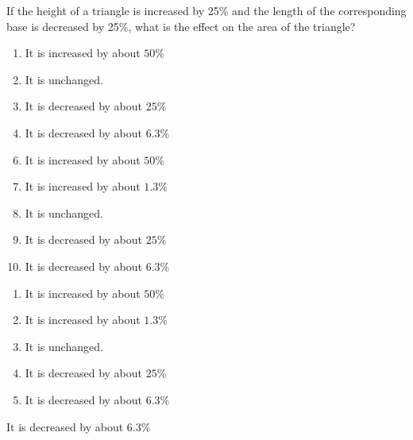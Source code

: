 If the height of a triangle is increased by 25\% and the length of
the corresponding base is decreased by 25\%, what is the effect on
the area of the triangle?


\ifsat
	\begin{enumerate}[label=\Alph*)]
		\item  It is increased by about $50\%$
		\item  It is unchanged.
		\item  It is decreased by about $25\%$
		\item  It is decreased by about $6.3\%$%
	\end{enumerate}
\else
\fi

\ifacteven
	\begin{enumerate}[label=\textbf{\Alph*.},itemsep=\fill,align=left]
		\setcounter{enumii}{5}
		\item  It is increased by about $50\%$
		\item  It is increased by about $1.3\%$
		\item  It is unchanged.
		\addtocounter{enumii}{1}
		\item  It is decreased by about $25\%$
		\item  It is decreased by about $6.3\%$%
	\end{enumerate}
\else
\fi

\ifactodd
	\begin{enumerate}[label=\textbf{\Alph*.},itemsep=\fill,align=left]
		\item  It is increased by about $50\%$
		\item  It is increased by about $1.3\%$
		\item  It is unchanged.
		\item  It is decreased by about $25\%$
		\item  It is decreased by about $6.3\%$%
	\end{enumerate}
\else
\fi

\ifgridin
  It is decreased by about $6.3\%$%

\else
\fi

